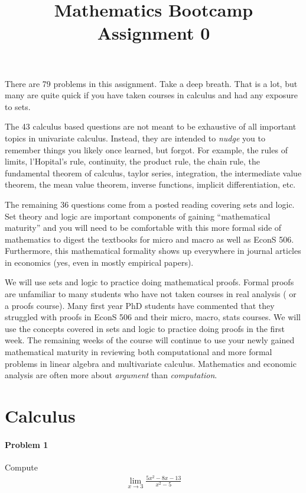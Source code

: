 \documentclass[a4paper, 11pt]{article}
\title{ Mathematics Bootcamp Assignment 0 }
\begin{document}
\maketitle

There are 79 problems in this assignment.
Take a deep breath.
That is a lot, but many are quite quick if you have taken courses in calculus and had any exposure to sets.

The 43 calculus based questions are not meant to be exhaustive of all important topics in univariate calculus.
Instead, they are intended to \emph{nudge} you to remember things you likely once learned, but forgot.
For example, the rules of limits, l'Hopital's rule, continuity, the product rule, the chain rule, the fundamental theorem of calculus, taylor series, integration, the intermediate value theorem, the mean value theorem, inverse functions, implicit differentiation, etc.

The remaining 36 questions come from a posted reading covering sets and logic.
Set theory and logic are important components of gaining ``mathematical maturity'' and you will need to be comfortable with this more formal side of mathematics to digest the textbooks for micro and macro as well as EconS 506.
Furthermore, this mathematical formality shows up everywhere in journal articles in economics (yes, even in mostly empirical papers).

We will use sets and logic to practice doing mathematical proofs.
Formal proofs are unfamiliar to many students who have not taken courses in real analysis ( or a proofs course).
Many first year PhD students have commented that they struggled with proofs in EconS 506 and their micro, macro, stats courses.
We will use the concepts covered in sets and logic to practice doing proofs in the first week.
The remaining weeks of the course will continue to use your newly gained mathematical maturity in reviewing both computational and more formal problems in linear algebra and multivariate calculus.
Mathematics and economic analysis are often more about \emph{argument} than \emph{computation}.


\section{Calculus}

\paragraph{Problem 1} Compute
\begin{align}
    \lim_{x\rightarrow 3} \frac{5x^2 - 8x -13}{x^2-5}  \nonumber
\end{align}
\end{document}
